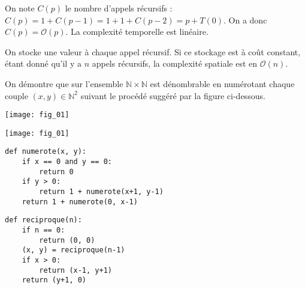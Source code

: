 \begin{multicols}{2}
\ifprof
\begin{corrige}
On note $C(p)$ le nombre d'appels récursifs : $C(p) = 1+C(p-1) = 1+1+C(p-2)=p+T(0)$. On a donc $C(p)=\mathcal{O}(p)$. La 
complexité temporelle est linéaire.
\end{corrige}
\else
\fi

\ifprof
\begin{corrige}
On stocke une valeur à chaque appel récursif. Si ce stockage est à coût constant, étant donné qu'il y a $n$ appels 
récursifs, la complexité spatiale est en $\mathcal{O}(n)$.
\end{corrige}
\else
\fi


\exer{}
\setcounter{numques}{0}

On démontre que sur l'ensemble $\mathbb{N}\times \mathbb{N}$ est dénombrable en numérotant chaque couple $(x,y)\in\mathbb{N}^2$ suivant le procédé suggéré par la figure ci-dessous.
\ifprof
\begin{center}
\texttt{[image: fig\_01]}
\end{center}
\else
\begin{center}
\texttt{[image: fig\_01]}
\end{center}
\fi

\ifprof
\begin{corrige}
\begin{lstlisting}
def numerote(x, y):
    if x == 0 and y == 0:
        return 0
    if y > 0:
        return 1 + numerote(x+1, y-1)
    return 1 + numerote(0, x-1)
\end{lstlisting}
\end{corrige}
\else
\fi

\ifprof
\begin{corrige}
\begin{lstlisting}
def reciproque(n):
    if n == 0:
        return (0, 0)
    (x, y) = reciproque(n-1)
    if x > 0:
        return (x-1, y+1)
    return (y+1, 0)
\end{lstlisting}
\end{corrige}
\else
\fi




\exer{}
\setcounter{numques}{0}


\end{multicols}
